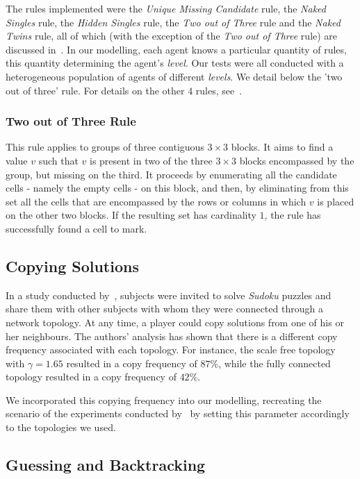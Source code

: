 \documentclass{article}
\begin{document}
The rules implemented were the {\em Unique Missing Candidate} rule, the {\em Naked Singles} rule, the {\em Hidden Singles} rule, the {\em Two out of Three} rule and the {\em Naked Twins} rule, all of which (with the exception of the {\em Two out of Three} rule) are discussed in~\cite{davis:mathsudoku}. In our modelling, each agent knows a particular quantity of rules, this quantity determining the agent's {\em level}. Our tests were all conducted with a heterogeneous population of agents of different {\em levels}. We detail below the 'two out of three' rule. For details on the other $4$ rules, see~\cite{davis:mathsudoku}.

\subsubsection{Two out of Three Rule}

This rule applies to groups of three contiguous $3 \times 3$ blocks. It aims to find a value $v$ such that $v$ is present in two of the three $3 \times 3$ blocks encompassed by the group, but missing on the third. It proceeds by enumerating all the candidate cells - namely the empty cells - on this block, and then, by eliminating from this set all the cells that are encompassed by the rows or columns in which $v$ is placed on the other two blocks. If the resulting set has cardinality $1$, the rule has successfully found a cell to mark.

\subsection{Copying Solutions}

In a study conducted by~\cite{farenzena:collabem}, subjects were invited to solve {\em Sudoku} puzzles and share them with other subjects with whom they were connected through a network topology. At any time, a player could copy solutions from one of his or her neighbours. The authors' analysis has shown that there is a different copy frequency associated with each topology. For instance, the scale free topology with $\gamma = 1.65$ resulted in a copy frequency of $87 \%$, while the fully connected topology resulted in a copy frequency of $42 \%$.

We incorporated this copying frequency into our modelling, recreating the scenario of the experiments conducted by~\cite{farenzena:collabem} by setting this parameter accordingly to the topologies we used.

\subsection{Guessing and Backtracking}
\end{document}
